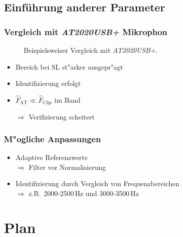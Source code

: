 \documentclass[11pt]{beamer}
\begin{document}
\subsection{Einf\"uhrung anderer Parameter}

\begin{frame}
\frametitle{Vergleich mit \textit{AT2020USB+} Mikrophon}
\begin{minipage}{.5\textwidth}
\begin{figure}
\caption{Beispielsweiser Vergleich mit \textit{AT2020USB+}.}
\end{figure}
\end{minipage}
\begin{minipage}{.4\textwidth}
\begin{itemize}
\item Bereich bei SL st"arker ausgepr"agt
\item Identifizierung erfolgt
\item \( \hat{F}_\mathrm{AT} \ll \hat{F}_\mathrm{Clip} \) im Band
\item[$\Rightarrow$] Verifizierung scheitert
\end{itemize}
\end{minipage}
\end{frame}

\begin{frame}
\frametitle{M"ogliche Anpassungen}
\begin{itemize}
\item Adaptive Referenzwerte \\ $\Rightarrow$ Filter vor Normalisierung
\item Identifizierung durch Vergleich von Frequenzbereichen \\ $\Rightarrow$ z.B.\ 2000-2500\,Hz und 3000-3500\,Hz
\end{itemize}
\end{frame}

\section{Plan}
\end{document}
